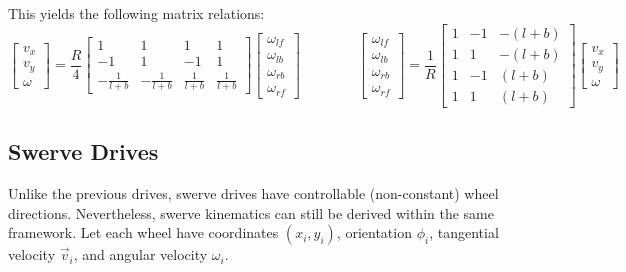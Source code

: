 \documentclass{article}
\begin{document}
This yields the following matrix relations:
\begin{equation*}
    \begin{bmatrix}
        v_x \\
        v_y \\
        \omega
    \end{bmatrix}
    =
    \frac{R}{4}
    \begin{bmatrix}
        1 & 1 & 1 & 1 \\
        -1 & 1 & -1 & 1 \\
        -\frac{1}{l+b} & -\frac{1}{l+b} & \frac{1}{l+b} & \frac{1}{l+b}
    \end{bmatrix}
    \begin{bmatrix}
        \omega_{lf} \\
        \omega_{lb} \\
        \omega_{rb} \\
        \omega_{rf}
    \end{bmatrix}
    \qquad\qquad
    \begin{bmatrix}
        \omega_{lf} \\
        \omega_{lb} \\
        \omega_{rb} \\
        \omega_{rf}
    \end{bmatrix}
    =
    \frac{1}{R}
    \begin{bmatrix}
        1 & -1 & -(l + b) \\
        1 & 1 & -(l + b) \\
        1 & -1 & (l + b) \\
        1 & 1 & (l + b)
    \end{bmatrix}
    \begin{bmatrix}
        v_x \\
        v_y \\
        \omega
    \end{bmatrix}
\end{equation*}

\subsection{Swerve Drives}
Unlike the previous drives, swerve drives have controllable (non-constant) wheel directions. Nevertheless, swerve kinematics can still be derived within the same framework. Let each wheel have coordinates $(x_i, y_i)$, orientation $\phi_i$, tangential velocity $\vec{v}_i$, and angular velocity $\omega_i$.\\
\end{document}
